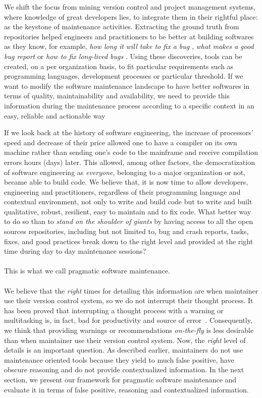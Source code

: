 We shift the focus from mining version control and project management systems, where knowledge of great developers lies, to integrate them in their rightful place: as the keystone of maintenance activities.
Extracting the ground truth from repositories helped engineers and practitioners to be better at building softwares as they know, for example, {\it how long it will take to fix a bug} \cite{Weiss2007}, {\it what makes a good bug report} \cite{Bettenburg2008} or {\it how to fix long-lived bugs} \cite{Saha2014}.
Using these discoveries, tools can be created, on a per organization basis, to fit particular requirements such as programming languages, development processes or particular threshold. If we want to modify the software maintenance landscape to have better softwares in terms of quality, maintainability and availability, we need to provide this information during the maintenance process according to a specific context in an easy, reliable and  actionable way

If we look back at the history of software engineering, the increase of processors' speed and decrease of their price allowed one to have a compiler on its own machine rather than sending one's code to the mainframe and receive compilation errors hours (days) later. This allowed, among other factors, the democratization of software engineering as {\it everyone}, belonging to a major organization or not, became able to build code. We believe that, it is now time to allow developers, engineering and practitioners, regardless of their programming language and contextual environment, not only to write and build code but to write and built qualitative, robust, resilient, easy to maintain and to fix code. What better way to do so than to {\it stand on the shoulder of giants} by having access to all the open sources repositories, including but not limited to, bug and crash reports, tasks, fixes, and good practices break down to the right level and provided at the right time during day to day maintenance sessions?
\\ \\
This is what we call pragmatic software maintenance.
\\ \\
We believe that the {\it right} times for detailing this information are when maintainer use their version control system, so we do not interrupt their thought process.
It has been proved that interrupting a thought process with a warning or multitasking is, in fact, bad for productivity and source of error~\cite{Trafton2003,Altmann2004,LOHR,hunt2008pragmatic,gobbo2008pomodoro}.
Consequently, we think that providing warnings or recommendations {\it on-the-fly} is less desirable than when maintainer use their version control system.
Now, the {\it right} level of details is an important question.
As described earlier, maintainers do not use maintenance oriented tools because they yield to much false positive, have obscure reasoning and do not provide contextualized information\cite{Hovemeyer2004, Lopez2011, Johnson2013, Lewis2013}.
In the next section, we present our framework for pragmatic software maintenance and evaluate it in terms of false positive, reasoning and contextualized information.


